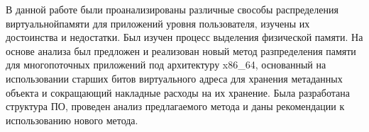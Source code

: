 \Conclusion %

В данной работе были проанализированы различные свособы распределения виртуальнойпамяти для приложений уровня пользователя, изучены их достоинства и недостатки. Был изучен процесс выделения физической памяти. На основе анализа был предложен и реализован новый метод разпределения памяти для многопоточных приложений под архитектуру x86\_64, основанный на использовании старших битов виртуального адреса для хранения метаданных объекта и сокращающий накладные расходы на их хранение. Была разработана структура ПО, проведен анализ предлагаемого метода и даны рекомендации к использованию нового метода.

